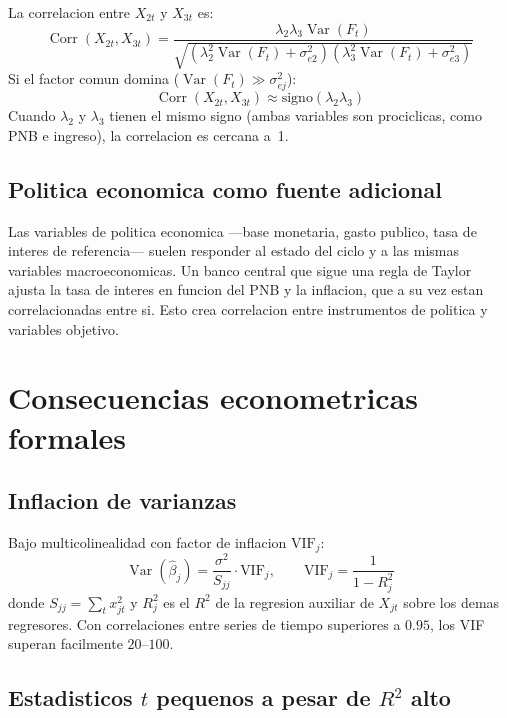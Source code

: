 \documentclass[12pt, letterpaper]{article}
\theoremstyle{remark}
\newcommand{\Var}{\operatorname{Var}}
\newcommand{\Corr}{\operatorname{Corr}}
\begin{document}
La correlacion entre $X_{2t}$ y $X_{3t}$ es:
\begin{equation}
  \Corr(X_{2t}, X_{3t})
    = \frac{\lambda_2 \lambda_3 \Var(F_t)}
           {\sqrt{(\lambda_2^2\Var(F_t)+\sigma_{e2}^2)(\lambda_3^2\Var(F_t)+\sigma_{e3}^2)}}
  \label{eq:corr_factor_expr}
\end{equation}
Si el factor comun domina ($\Var(F_t) \gg \sigma_{ej}^2$):
\begin{equation}
  \Corr(X_{2t}, X_{3t}) \approx \text{signo}(\lambda_2\lambda_3)
  \label{eq:corr_factor_lim}
\end{equation}
Cuando $\lambda_2$ y $\lambda_3$ tienen el mismo signo (ambas variables
son prociclicas, como PNB e ingreso), la correlacion es cercana a~1.

\subsection{Politica economica como fuente adicional}

Las variables de politica economica ---base monetaria, gasto publico, tasa
de interes de referencia--- suelen responder al estado del ciclo y a las
mismas variables macroeconomicas. Un banco central que sigue una regla de
Taylor ajusta la tasa de interes en funcion del PNB y la inflacion, que a su
vez estan correlacionadas entre si. Esto crea correlacion entre instrumentos
de politica y variables objetivo.

\section{Consecuencias econometricas formales}

\subsection{Inflacion de varianzas}

Bajo multicolinealidad con factor de inflacion $\text{VIF}_j$:
\begin{equation}
  \Var(\hat\beta_j) = \frac{\sigma^2}{S_{jj}} \cdot \text{VIF}_j,
  \qquad \text{VIF}_j = \frac{1}{1 - R_j^2}
  \label{eq:var_vif}
\end{equation}
donde $S_{jj} = \sum_t x_{jt}^2$ y $R_j^2$ es el $R^2$ de la regresion
auxiliar de $X_{jt}$ sobre los demas regresores. Con correlaciones entre
series de tiempo superiores a $0.95$, los VIF superan facilmente $20$--$100$.

\subsection{Estadisticos $t$ pequenos a pesar de $R^2$ alto}
\end{document}

